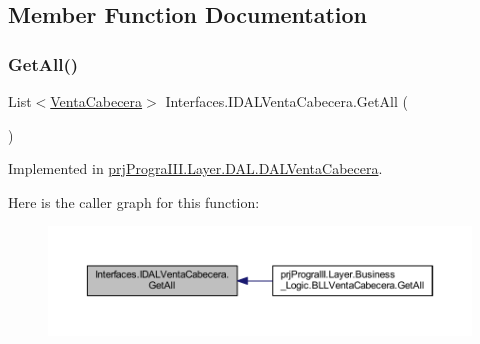 \subsection{Member Function Documentation}
\hypertarget{interface_interfaces_1_1_i_d_a_l_venta_cabecera_a24d7801773ac5c75332be9f7efdd04b9}{}\label{interface_interfaces_1_1_i_d_a_l_venta_cabecera_a24d7801773ac5c75332be9f7efdd04b9} 
\subsubsection{\texorpdfstring{Get\+All()}{GetAll()}}
{\footnotesize\ttfamily List$<$\hyperlink{classprj_progra_i_i_i_1_1_layer_1_1_entities_1_1_venta_cabecera}{Venta\+Cabecera}$>$ Interfaces.\+I\+D\+A\+L\+Venta\+Cabecera.\+Get\+All (\begin{DoxyParamCaption}{ }\end{DoxyParamCaption})}



Implemented in \hyperlink{classprj_progra_i_i_i_1_1_layer_1_1_d_a_l_1_1_d_a_l_venta_cabecera_a136378281851cb3aa0f0791a076b1351}{prj\+Progra\+I\+I\+I.\+Layer.\+D\+A\+L.\+D\+A\+L\+Venta\+Cabecera}.

Here is the caller graph for this function\+:
\nopagebreak
\begin{figure}[H]
\begin{center}
\leavevmode
\includegraphics[width=350pt]{interface_interfaces_1_1_i_d_a_l_venta_cabecera_a24d7801773ac5c75332be9f7efdd04b9_icgraph}
\end{center}
\end{figure}
\hypertarget{interface_interfaces_1_1_i_d_a_l_venta_cabecera_a7da4b1733d4a28cbfe906d018d344355}{}\label{interface_interfaces_1_1_i_d_a_l_venta_cabecera_a7da4b1733d4a28cbfe906d018d344355} 
